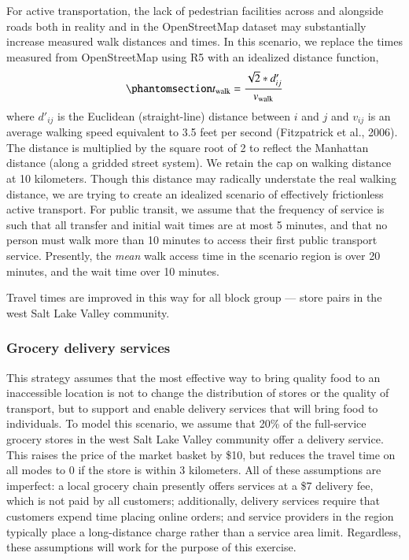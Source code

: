 \documentclass[
  letterpaper,
  number,
  review,
  3p]{elsarticle}
\begin{document}
For active transportation, the lack of pedestrian facilities across and
alongside roads both in reality and in the OpenStreetMap dataset may
substantially increase measured walk distances and times. In this
scenario, we replace the times measured from OpenStreetMap using R5 with
an idealized distance function,
\begin{equation}\phantomsection\label{eq-newwalk}{ 
t_{\mathrm{walk}} = \frac{\sqrt{2} * d'_{ij}}{v_{\mathrm{walk}}}
}\end{equation} where \(d'_{ij}\) is the Euclidean (straight-line)
distance between \(i\) and \(j\) and \(v_{ij}\) is an average walking
speed equivalent to 3.5 feet per second (Fitzpatrick et al., 2006). The
distance is multiplied by the square root of 2 to reflect the Manhattan
distance (along a gridded street system). We retain the cap on walking
distance at 10 kilometers. Though this distance may radically understate
the real walking distance, we are trying to create an idealized scenario
of effectively frictionless active transport. For public transit, we
assume that the frequency of service is such that all transfer and
initial wait times are at most 5 minutes, and that no person must walk
more than 10 minutes to access their first public transport service.
Presently, the \emph{mean} walk access time in the scenario region is
over 20 minutes, and the wait time over 10 minutes.

Travel times are improved in this way for all block group --- store
pairs in the west Salt Lake Valley community.

\subsubsection{Grocery delivery
services}\label{grocery-delivery-services}

This strategy assumes that the most effective way to bring quality food
to an inaccessible location is not to change the distribution of stores
or the quality of transport, but to support and enable delivery services
that will bring food to individuals. To model this scenario, we assume
that 20\% of the full-service grocery stores in the west Salt Lake
Valley community offer a delivery service. This raises the price of the
market basket by \$10, but reduces the travel time on all modes to 0 if
the store is within 3 kilometers. All of these assumptions are
imperfect: a local grocery chain presently offers services at a \$7
delivery fee, which is not paid by all customers; additionally, delivery
services require that customers expend time placing online orders; and
service providers in the region typically place a long-distance charge
rather than a service area limit. Regardless, these assumptions will
work for the purpose of this exercise.
\end{document}
